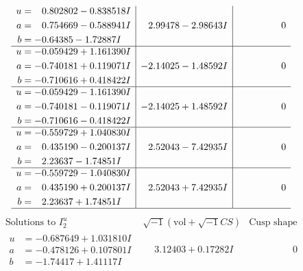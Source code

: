 \documentclass[1p]{elsarticle_modified}
\theoremstyle{definition}
\newcommand{\I}{\sqrt{-1}}
\begin{document}
$$\begin{array}{c|c|c}
\begin{aligned}
u &= \phantom{-}0.802802 - 0.838518 I \\
a &= \phantom{-}0.754669 - 0.588941 I \\
b &= -0.64385 - 1.72887 I\end{aligned}
 & \phantom{-}2.99478 - 2.98643 I & \phantom{-0.000000 } 0 \\ \hline\begin{aligned}
u &= -0.059429 + 1.161390 I \\
a &= -0.740181 + 0.119071 I \\
b &= -0.710616 + 0.418422 I\end{aligned}
 & -2.14025 - 1.48592 I & \phantom{-0.000000 } 0 \\ \hline\begin{aligned}
u &= -0.059429 - 1.161390 I \\
a &= -0.740181 - 0.119071 I \\
b &= -0.710616 - 0.418422 I\end{aligned}
 & -2.14025 + 1.48592 I & \phantom{-0.000000 } 0 \\ \hline\begin{aligned}
u &= -0.559729 + 1.040830 I \\
a &= \phantom{-}0.435190 - 0.200137 I \\
b &= \phantom{-}2.23637 - 1.74851 I\end{aligned}
 & \phantom{-}2.52043 - 7.42935 I & \phantom{-0.000000 } 0 \\ \hline\begin{aligned}
u &= -0.559729 - 1.040830 I \\
a &= \phantom{-}0.435190 + 0.200137 I \\
b &= \phantom{-}2.23637 + 1.74851 I\end{aligned}
 & \phantom{-}2.52043 + 7.42935 I & \phantom{-0.000000 } 0\\
 \hline 
 \end{array}$$\newpage$$\begin{array}{c|c|c}  
\text{Solutions to }I^u_{2}& \I (\text{vol} + \sqrt{-1}CS) & \text{Cusp shape}\\
 \hline 
\begin{aligned}
u &= -0.687649 + 1.031810 I \\
a &= -0.478126 + 0.107801 I \\
b &= -1.74417 + 1.41117 I\end{aligned}
 & \phantom{-}3.12403 + 0.17282 I & \phantom{-0.000000 } 0 \\ \hline\begin{aligned}

\end{aligned}
\end{array}$$
\end{document}
